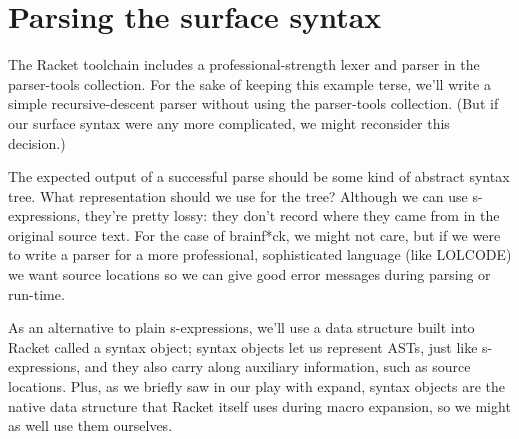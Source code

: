 \documentclass{article}
\begin{document}
\section{Parsing the surface syntax}

The Racket toolchain includes a professional-strength lexer and parser in the parser-tools collection. For the sake of keeping this example terse, we'll write a simple recursive-descent parser without using the parser-tools collection. (But if our surface syntax were any more complicated, we might reconsider this decision.)

The expected output of a successful parse should be some kind of abstract syntax tree. What representation should we use for the tree? Although we can use s-expressions, they're pretty lossy: they don't record where they came from in the original source text. For the case of brainf*ck, we might not care, but if we were to write a parser for a more professional, sophisticated language (like LOLCODE) we want source locations so we can give good error messages during parsing or run-time.

As an alternative to plain s-expressions, we'll use a data structure built into Racket called a syntax object; syntax objects let us represent ASTs, just like s-expressions, and they also carry along auxiliary information, such as source locations. Plus, as we briefly saw in our play with expand, syntax objects are the native data structure that Racket itself uses during macro expansion, so we might as well use them ourselves.
\end{document}
